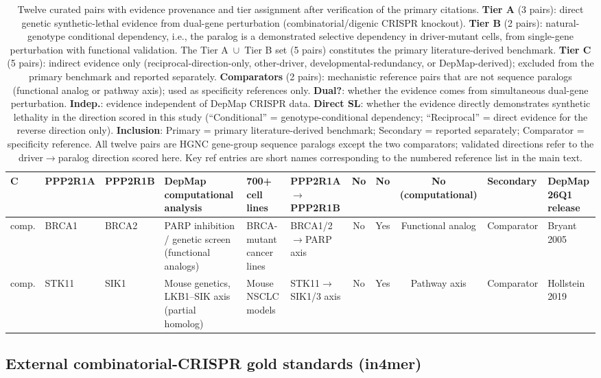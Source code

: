 \documentclass[11pt,a4paper]{article}
\begin{document}
\begin{table}[H]
{\begin{tabular}{lllp{3.6cm}p{2.6cm}p{2.2cm}cccp{1.5cm}l}
C & PPP2R1A & PPP2R1B & DepMap computational analysis & 700+ cell lines & PPP2R1A$\rightarrow$PPP2R1B & No & No & No (computational) & Secondary & DepMap 26Q1 release \\
\midrule
comp. & BRCA1 & BRCA2 & PARP inhibition / genetic screen (functional analogs) & BRCA-mutant cancer lines & BRCA1/2$\rightarrow$PARP axis & No & Yes & Functional analog & Comparator & Bryant 2005 \\
comp. & STK11 & SIK1 & Mouse genetics, LKB1--SIK axis (partial homolog) & Mouse NSCLC models & STK11$\rightarrow$SIK1/3 axis & No & Yes & Pathway axis & Comparator & Hollstein 2019 \\
\bottomrule
\end{tabular}%
}
\caption{Twelve curated pairs with evidence provenance and tier assignment after verification of the primary citations. \textbf{Tier A} (3 pairs): direct genetic synthetic-lethal evidence from dual-gene perturbation (combinatorial/digenic CRISPR knockout). \textbf{Tier B} (2 pairs): natural-genotype conditional dependency, i.e., the paralog is a demonstrated selective dependency in driver-mutant cells, from single-gene perturbation with functional validation. The Tier A~$\cup$~Tier B set (5 pairs) constitutes the primary literature-derived benchmark. \textbf{Tier C} (5 pairs): indirect evidence only (reciprocal-direction-only, other-driver, developmental-redundancy, or DepMap-derived); excluded from the primary benchmark and reported separately. \textbf{Comparators} (2 pairs): mechanistic reference pairs that are not sequence paralogs (functional analog or pathway axis); used as specificity references only. \textbf{Dual?}: whether the evidence comes from simultaneous dual-gene perturbation. \textbf{Indep.}: evidence independent of DepMap CRISPR data. \textbf{Direct SL}: whether the evidence directly demonstrates synthetic lethality in the direction scored in this study (``Conditional'' = genotype-conditional dependency; ``Reciprocal'' = direct evidence for the reverse direction only). \textbf{Inclusion}: Primary = primary literature-derived benchmark; Secondary = reported separately; Comparator = specificity reference. All twelve pairs are HGNC gene-group sequence paralogs except the two comparators; validated directions refer to the driver$\rightarrow$paralog direction scored here. Key ref entries are short names corresponding to the numbered reference list in the main text.}
\end{table}

\subsection{External combinatorial-CRISPR gold standards (in4mer)}
\end{document}
